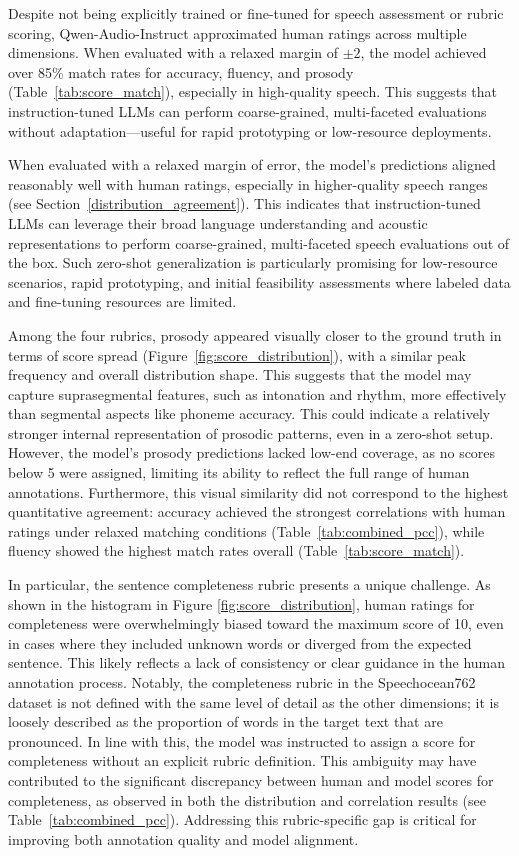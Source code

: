 \documentclass{Interspeech}
\begin{document}
Despite not being explicitly trained or fine-tuned for speech assessment or rubric scoring, Qwen-Audio-Instruct approximated human ratings across multiple dimensions. When evaluated with a relaxed margin of $\pm2$, the model achieved over 85\% match rates for accuracy, fluency, and prosody (Table~\ref{tab:score_match}), especially in high-quality speech. This suggests that instruction-tuned LLMs can perform coarse-grained, multi-faceted evaluations without adaptation—useful for rapid prototyping or low-resource deployments.

When evaluated with a relaxed margin of error, the model’s predictions aligned reasonably well with human ratings, especially in higher-quality speech ranges (see Section~\ref{distribution_agreement}). This indicates that instruction-tuned LLMs can leverage their broad language understanding and acoustic representations to perform coarse-grained, multi-faceted speech evaluations out of the box. Such zero-shot generalization is particularly promising for low-resource scenarios, rapid prototyping, and initial feasibility assessments where labeled data and fine-tuning resources are limited. 

Among the four rubrics, prosody appeared visually closer to the ground truth in terms of score spread (Figure~\ref{fig:score_distribution}), with a similar peak frequency and overall distribution shape. This suggests that the model may capture suprasegmental features, such as intonation and rhythm, more effectively than segmental aspects like phoneme accuracy. This could indicate a relatively stronger internal representation of prosodic patterns, even in a zero-shot setup. However, the model’s prosody predictions lacked low-end coverage, as no scores below 5 were assigned, limiting its ability to reflect the full range of human annotations. Furthermore, this visual similarity did not correspond to the highest quantitative agreement: accuracy achieved the strongest correlations with human ratings under relaxed matching conditions (Table~\ref{tab:combined_pcc}), while fluency showed the highest match rates overall (Table~\ref{tab:score_match}).

In particular, the sentence completeness rubric presents a unique challenge. As shown in the histogram in Figure \ref{fig:score_distribution}, human ratings for completeness were overwhelmingly biased toward the maximum score of 10, even in cases where they included unknown words or diverged from the expected sentence. This likely reflects a lack of consistency or clear guidance in the human annotation process. Notably, the completeness rubric in the Speechocean762 dataset is not defined with the same level of detail as the other dimensions; it is loosely described as the proportion of words in the target text that are pronounced. In line with this, the model was instructed to assign a score for completeness without an explicit rubric definition. This ambiguity may have contributed to the significant discrepancy between human and model scores for completeness, as observed in both the distribution and correlation results (see Table~\ref{tab:combined_pcc}). Addressing this rubric-specific gap is critical for improving both annotation quality and model alignment.
\end{document}
